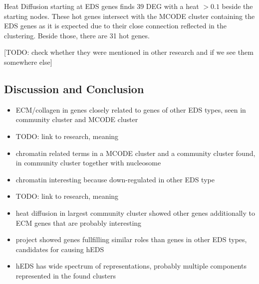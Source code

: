 Heat Diffusion starting at EDS genes finds 39 DEG with a heat $> 0.1$ beside the starting nodes. These hot genes intersect with the MCODE cluster containing the EDS genes as it is expected due to their close connection reflected in the clustering. Beside those, there are 31 hot genes.


[TODO: check whether they were mentioned in other research and if we see them somewhere else]

\subsection{Discussion and Conclusion}

\begin{itemize}
	\item ECM/collagen in genes closely related to genes of other EDS types, seen in community cluster and MCODE cluster
	\item TODO: link to research, meaning
	\item chromatin related terms in a MCODE cluster and a community cluster found, in community cluster together with nucleosome
	\item chromatin interesting because down-regulated in other EDS type
	\item TODO: link to research, meaning
	\item heat diffusion in largest community cluster showed other genes additionally to ECM genes that are probably interesting
	\item project showed genes fullfilling similar roles than genes in other EDS types, candidates for causing hEDS
	\item hEDS has wide spectrum of representations, probably multiple components represented in the found clusters
\end{itemize}

